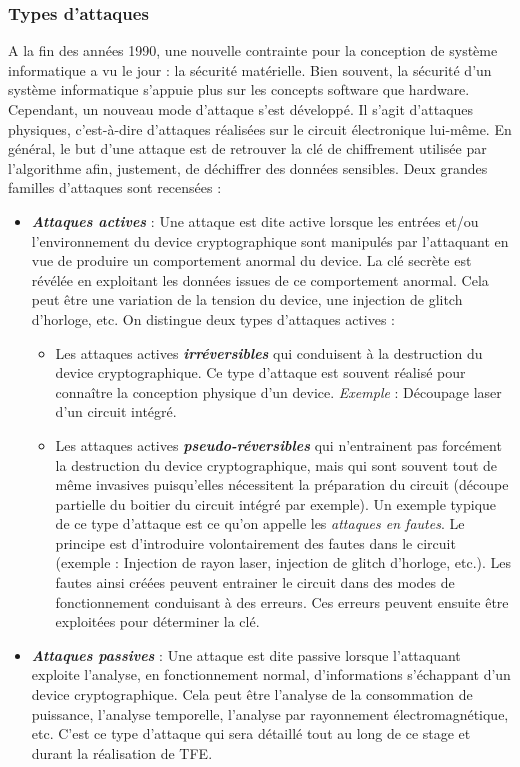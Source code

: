 \documentclass[10pt, oneside, a4paper]{article}
\begin{document}
\subsubsection{Types d'attaques}

\vspace{-0.1 cm}A la fin des années 1990, une nouvelle contrainte pour la conception de système informatique a vu le jour : la sécurité matérielle. Bien souvent, la sécurité d'un système informatique s'appuie plus sur les concepts software que hardware. Cependant, un nouveau mode d'attaque s'est développé. Il s'agit d'attaques physiques, c'est-à-dire d'attaques réalisées sur le circuit électronique lui-même. En général, le but d'une attaque est de retrouver la clé de chiffrement utilisée par l'algorithme afin, justement, de déchiffrer des données sensibles. Deux grandes familles d'attaques sont recensées : 
\begin{itemize}
\item \textbf{\textit{Attaques actives}} : Une attaque est dite active lorsque les entrées et/ou l'environnement du device cryptographique sont manipulés par l'attaquant en vue de produire un comportement anormal du device. La clé secrète est révélée en exploitant les données issues de ce comportement anormal. Cela peut être une variation de la tension du device, une injection de glitch d'horloge, etc. On distingue deux types d'attaques actives : 
\begin{itemize}
\item Les attaques actives \textbf{\textit{irréversibles}} qui conduisent à la destruction du device cryptographique. Ce type d'attaque est souvent réalisé pour connaître la conception physique d'un device. \textit{Exemple} : Découpage laser d’un circuit intégré.
\item Les attaques actives \textbf{\textit{pseudo-réversibles}} qui n’entrainent pas forcément la destruction du device cryptographique, mais qui sont souvent tout de même invasives puisqu’elles nécessitent la préparation du circuit (découpe partielle du boitier du circuit intégré par exemple). Un exemple typique de ce type d'attaque est ce qu'on appelle les \textit{attaques en fautes}. Le principe est d'introduire volontairement des fautes dans le circuit (exemple : Injection de rayon laser, injection de glitch d’horloge, etc.). Les fautes ainsi créées peuvent entrainer le circuit dans des modes de fonctionnement conduisant à des erreurs. Ces erreurs peuvent ensuite être exploitées pour déterminer la clé.
\end{itemize}
\item \textbf{\textit{Attaques passives}} : Une attaque est dite passive lorsque l'attaquant exploite l'analyse, en fonctionnement normal, d'informations s'échappant d'un device cryptographique. Cela peut être l'analyse de la consommation de puissance, l'analyse temporelle, l'analyse par rayonnement électromagnétique, etc. C'est ce type d'attaque qui sera détaillé tout au long de ce stage et durant la réalisation de TFE. \\
\end{itemize}
\end{document}
